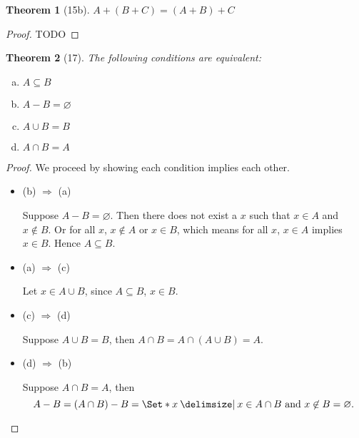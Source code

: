 \documentclass[12pt]{article}
\theoremstyle{plain}
\newtheorem*{exthm}{Theorem}
\theoremstyle{remark}
\theoremstyle{definition}
\theoremstyle{remark}
\providecommand\st{}
\newcommand\SetSymbol[1][]{%
  \nonscript\:#1\vert%
  \allowbreak%
  \nonscript\:
\mathopen{}}
\renewcommand\st{\SetSymbol[\delimsize]}
\begin{document}
\begin{exthm}[15b]
  $A + (B + C) = (A + B) + C$
\end{exthm}
\begin{proof}
  TODO
\end{proof}

\begin{exthm}[17]
  The following conditions are equivalent:
  \begin{multicols}{2}
    \begin{enumerate}[(a)]
      \item $A \subseteq B$
      \item $A - B = \varnothing$
      \item $A \cup B = B$
      \item $A \cap B = A$
    \end{enumerate}
  \end{multicols}
\end{exthm}
\begin{proof}
  We proceed by showing each condition implies each other.
  \begin{itemize}
    \item (b) $\Rightarrow$ (a)

      Suppose $A - B = \varnothing$. Then there does not exist a $x$ such that $x \in A$ and $x \not\in B$. Or for all $x$, $x \not\in A$ or $x \in B$, which means for all $x$, $x \in A$ implies $x \in B$. Hence $A \subseteq B$.
    \item (a) $\Rightarrow$ (c)

      Let $x \in A \cup B$, since $A \subseteq B$, $x \in B$.

    \item (c) $\Rightarrow$ (d)

      Suppose $A \cup B = B$, then $A \cap B = A \cap (A \cup B) = A$.

    \item (d) $\Rightarrow$ (b)

      Suppose $A \cap B = A$, then
      \[
        A - B = (A \cap B) - B = \Set*{x \st x \in A \cap B\ \text{and}\ x \not\in B} = \varnothing.
      \]

  \end{itemize}
\end{proof}
\end{document}
